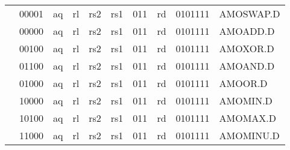 \begin{table}[p]
\begin{small}
\begin{center}
\begin{tabular}{p{0in}p{0.4in}p{0.05in}p{0.05in}p{0.05in}p{0.05in}p{0.4in}p{0.6in}p{0.4in}p{0.6in}p{0.7in}l}
&
\multicolumn{2}{|c|}{00001} &
\multicolumn{1}{c|}{aq} &
\multicolumn{1}{c|}{rl} &
\multicolumn{2}{c|}{rs2} &
\multicolumn{1}{c|}{rs1} &
\multicolumn{1}{c|}{011} &
\multicolumn{1}{c|}{rd} &
\multicolumn{1}{c|}{0101111} & AMOSWAP.D \\
\cline{2-11}


&
\multicolumn{2}{|c|}{00000} &
\multicolumn{1}{c|}{aq} &
\multicolumn{1}{c|}{rl} &
\multicolumn{2}{c|}{rs2} &
\multicolumn{1}{c|}{rs1} &
\multicolumn{1}{c|}{011} &
\multicolumn{1}{c|}{rd} &
\multicolumn{1}{c|}{0101111} & AMOADD.D \\
\cline{2-11}


&
\multicolumn{2}{|c|}{00100} &
\multicolumn{1}{c|}{aq} &
\multicolumn{1}{c|}{rl} &
\multicolumn{2}{c|}{rs2} &
\multicolumn{1}{c|}{rs1} &
\multicolumn{1}{c|}{011} &
\multicolumn{1}{c|}{rd} &
\multicolumn{1}{c|}{0101111} & AMOXOR.D \\
\cline{2-11}


&
\multicolumn{2}{|c|}{01100} &
\multicolumn{1}{c|}{aq} &
\multicolumn{1}{c|}{rl} &
\multicolumn{2}{c|}{rs2} &
\multicolumn{1}{c|}{rs1} &
\multicolumn{1}{c|}{011} &
\multicolumn{1}{c|}{rd} &
\multicolumn{1}{c|}{0101111} & AMOAND.D \\
\cline{2-11}


&
\multicolumn{2}{|c|}{01000} &
\multicolumn{1}{c|}{aq} &
\multicolumn{1}{c|}{rl} &
\multicolumn{2}{c|}{rs2} &
\multicolumn{1}{c|}{rs1} &
\multicolumn{1}{c|}{011} &
\multicolumn{1}{c|}{rd} &
\multicolumn{1}{c|}{0101111} & AMOOR.D \\
\cline{2-11}


&
\multicolumn{2}{|c|}{10000} &
\multicolumn{1}{c|}{aq} &
\multicolumn{1}{c|}{rl} &
\multicolumn{2}{c|}{rs2} &
\multicolumn{1}{c|}{rs1} &
\multicolumn{1}{c|}{011} &
\multicolumn{1}{c|}{rd} &
\multicolumn{1}{c|}{0101111} & AMOMIN.D \\
\cline{2-11}


&
\multicolumn{2}{|c|}{10100} &
\multicolumn{1}{c|}{aq} &
\multicolumn{1}{c|}{rl} &
\multicolumn{2}{c|}{rs2} &
\multicolumn{1}{c|}{rs1} &
\multicolumn{1}{c|}{011} &
\multicolumn{1}{c|}{rd} &
\multicolumn{1}{c|}{0101111} & AMOMAX.D \\
\cline{2-11}


&
\multicolumn{2}{|c|}{11000} &
\multicolumn{1}{c|}{aq} &
\multicolumn{1}{c|}{rl} &
\multicolumn{2}{c|}{rs2} &
\multicolumn{1}{c|}{rs1} &
\multicolumn{1}{c|}{011} &
\multicolumn{1}{c|}{rd} &
\multicolumn{1}{c|}{0101111} & AMOMINU.D \\
\cline{2-11}



\end{tabular}
\end{center}
\end{small}
\end{table}
